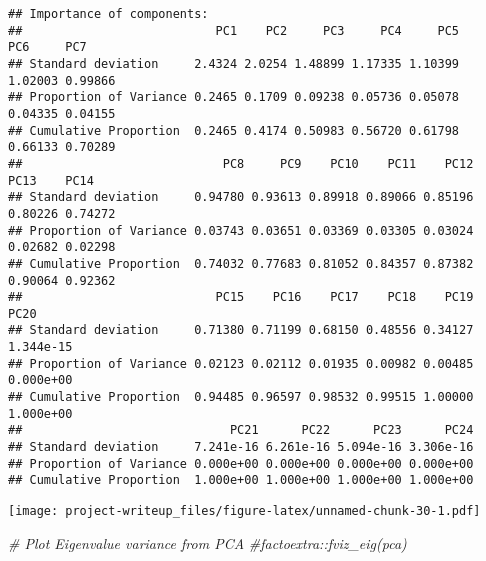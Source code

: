 \documentclass[
]{article}
\newenvironment{Shaded}{\begin{snugshade}}{\end{snugshade}}
\newcommand{\CommentTok}[1]{\textcolor[rgb]{0.56,0.35,0.01}{\textit{#1}}}
\newcommand{\DataTypeTok}[1]{\textcolor[rgb]{0.13,0.29,0.53}{#1}}
\newcommand{\DecValTok}[1]{\textcolor[rgb]{0.00,0.00,0.81}{#1}}
\newcommand{\KeywordTok}[1]{\textcolor[rgb]{0.13,0.29,0.53}{\textbf{#1}}}
\newcommand{\NormalTok}[1]{#1}
\newcommand{\OperatorTok}[1]{\textcolor[rgb]{0.81,0.36,0.00}{\textbf{#1}}}
\newcommand{\StringTok}[1]{\textcolor[rgb]{0.31,0.60,0.02}{#1}}
\begin{document}
\begin{verbatim}
## Importance of components:
##                           PC1    PC2     PC3     PC4     PC5     PC6     PC7
## Standard deviation     2.4324 2.0254 1.48899 1.17335 1.10399 1.02003 0.99866
## Proportion of Variance 0.2465 0.1709 0.09238 0.05736 0.05078 0.04335 0.04155
## Cumulative Proportion  0.2465 0.4174 0.50983 0.56720 0.61798 0.66133 0.70289
##                            PC8     PC9    PC10    PC11    PC12    PC13    PC14
## Standard deviation     0.94780 0.93613 0.89918 0.89066 0.85196 0.80226 0.74272
## Proportion of Variance 0.03743 0.03651 0.03369 0.03305 0.03024 0.02682 0.02298
## Cumulative Proportion  0.74032 0.77683 0.81052 0.84357 0.87382 0.90064 0.92362
##                           PC15    PC16    PC17    PC18    PC19      PC20
## Standard deviation     0.71380 0.71199 0.68150 0.48556 0.34127 1.344e-15
## Proportion of Variance 0.02123 0.02112 0.01935 0.00982 0.00485 0.000e+00
## Cumulative Proportion  0.94485 0.96597 0.98532 0.99515 1.00000 1.000e+00
##                             PC21      PC22      PC23      PC24
## Standard deviation     7.241e-16 6.261e-16 5.094e-16 3.306e-16
## Proportion of Variance 0.000e+00 0.000e+00 0.000e+00 0.000e+00
## Cumulative Proportion  1.000e+00 1.000e+00 1.000e+00 1.000e+00
\end{verbatim}

\begin{Shaded}
\end{Shaded}

\texttt{[image: project-writeup\_files/figure-latex/unnamed-chunk-30-1.pdf]}

\begin{Shaded}
\begin{Highlighting}[]
\CommentTok{# Plot Eigenvalue variance from PCA}
\CommentTok{#factoextra::fviz_eig(pca)}
\end{Highlighting}
\end{Shaded}
\end{document}
